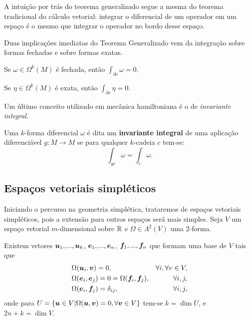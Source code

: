A intuição por trás do teorema generalizado segue a mesma do teorema tradicional do cálculo vetorial: integrar o diferencial de um operador em um espaço é o mesmo que integrar o operador no bordo desse espaço.

Duas implicações imediatas do Teorema Generalizado vem da integração sobre formas fechadas e sobre formas exatas.

\begin{corollary}\label{corolario:integral_formas_fechadas}
    Se $\omega \in \Omega^k (M)$ é fechada, então $\int_{\partial c} \omega = 0$.
\end{corollary}

\begin{corollary}
    Se $\eta \in \Omega^k (M)$ é exata, então $\int_{\partial c} \eta = 0$.
\end{corollary}

Um último conceito utilizado em mecânica hamiltoniana é o de \textit{invariante integral}.

\begin{definition}
    Uma $k$-forma diferencial $\omega$ é dita um \textbf{invariante integral} de uma aplicação diferenciável $g: M \to M$ se para qualquer $k$-cadeia $c$ tem-se:
    \begin{equation*}
        \int_{gc} \omega = \int_c \omega.
    \end{equation*}
\end{definition}

\subsection{Espaços vetoriais simpléticos}
Iniciando o percurso na geometria simplética, trataremos de espaços vetoriais simpléticos, pois a extensão para outros espaços será mais simples. Seja $V$ um espaço vetorial $m$-dimensional sobre $\mathbb{R}$ e $\Omega \in \Lambda^2(V)$ uma 2-forma.

\begin{theorem}\label{teorema:standard_basis_symplectic}\citep{silva_lectures_2001}
    Existem vetores $\bm u_1, ..., \bm u_k$, $\bm e_1, ..., \bm e_n$, $\bm f_1, ..., \bm f_n$ que formam uma base de $V$ tais que
    \begin{align*}
        &\Omega(\bm u_i, \bm v) = 0,  &\forall i, \forall v \in V, \\
        &\Omega(\bm e_i, \bm e_j) = 0 = \Omega(\bm f_i, \bm f_j), &\forall i, j, \\
        &\Omega(\bm e_i, \bm f_j) = \delta_{ij}, &\quad \forall i, j,
    \end{align*}
    onde para $U = \{\bm u \in V | \Omega(\bm u, \bm v) = 0, \forall \bm v \in V\}$ tem-se $k=\dim U$, e $2n + k = \dim V$.
\end{theorem}

